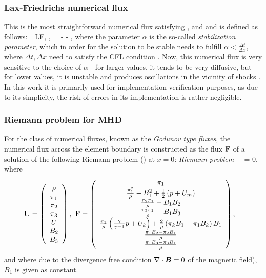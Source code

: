\subsubsection{Lax-Friedrichs numerical flux}
This is the most straightforward numerical flux satisfying , and  and is defined as follows:
\be
\mrH_{LF}\lo \mrv, \mrw, \bfn\ro = \left[\mrF\lo\mrv\ro + \mrF\lo\mrw\ro\right] - \lo \mrw - \mrv\ro,
\ee
where the parameter $\alpha$ is the so-called \textit{stabilization parameter}, which in order for the solution to be stable needs to fulfill $\alpha < \frac{\Delta t}{\Delta x}$, where $\Delta t, \Delta x$ need to satisfy the CFL condition . Now, this numerical flux is very sensitive to the choice of $\alpha$ - for larger values, it tends to be very diffusive, but for lower values, it is unstable and produces oscillations in the vicinity of shocks \cite{lfunstable}. In this work it is primarily used for implementation verification purposes, as due to its simplicity, the risk of errors in its implementation is rather negligible.

\subsubsection{Riemann problem for MHD}
For the class of numerical fluxes, known as the \textit{Godunov type fluxes}, the numerical flux across the element boundary is constructed as the flux $\mathrm{\mathbf{F}}$ of a solution of the following Riemann problem () at $x = 0$:
\textit{Riemann problem}
\be
\label{Riemann}
 +  = 0,
\ee
where
\begin{align}
\label{RiemannUDef}
\mathrm{\mathbf{U}} & =  \left(\begin{array}{c}\rho \\ \pi_1 \\ \pi_2 \\ \pi_3 \\ U \\ B_2 \\ B_3 \\ \end{array}\right),\ \mathrm{\mathbf{F}} = \left(\begin{array}{c} \pi_1 \\ \frac{\pi_1^2}{\rho} - B_1^2 + \frac12\left( p + U_m\right) \\ \frac{\pi_2 \pi_1}{\rho} - B_1 B_2 \\ \frac{\pi_3 \pi_1}{\rho} - B_1 B_3\\ \frac{\pi_1}{\rho} \left( \frac{\gamma}{\gamma - 1} p + U_k\right) + \frac{2}{\rho} \left( \pi_k B_1 - \pi_1 B_k\right) B_1  \\ \frac{\pi_1 B_2 - \pi_2 B_1}{\rho} \\ \frac{\pi_1 B_3 - \pi_3 B_1}{\rho} \\ \end{array}\right),
\end{align}
and where due to the divergence free condition $\nabla\cdot \mbox{\boldmath $B$} = 0$ of the magnetic field), $B_1$ is given as constant.
